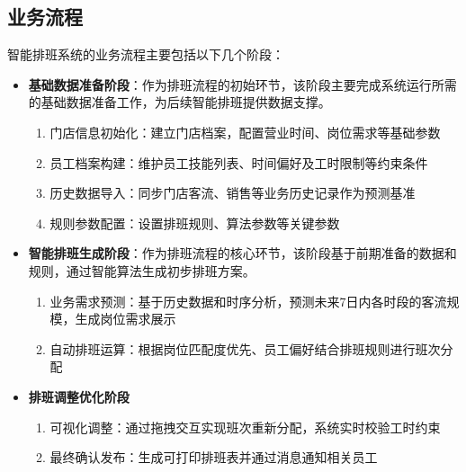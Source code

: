 \documentclass{ctexart}
\begin{document}
\begin{itemize}
    
\end{itemize}

\subsection{业务流程}
智能排班系统的业务流程主要包括以下几个阶段：

\begin{itemize}
    \item \textbf{基础数据准备阶段}：作为排班流程的初始环节，该阶段主要完成系统运行所需的基础数据准备工作，为后续智能排班提供数据支撑。
    \begin{enumerate}
        \item 门店信息初始化：建立门店档案，配置营业时间、岗位需求等基础参数
        \item 员工档案构建：维护员工技能列表、时间偏好及工时限制等约束条件
        \item 历史数据导入：同步门店客流、销售等业务历史记录作为预测基准
        \item 规则参数配置：设置排班规则、算法参数等关键参数
    \end{enumerate}

    \item \textbf{智能排班生成阶段}：作为排班流程的核心环节，该阶段基于前期准备的数据和规则，通过智能算法生成初步排班方案。
        \begin{enumerate}
            \item 业务需求预测：基于历史数据和时序分析，预测未来7日内各时段的客流规模，生成岗位需求展示
            \item 自动排班运算：根据岗位匹配度优先、员工偏好结合排班规则进行班次分配
        \end{enumerate}

    \item \textbf{排班调整优化阶段}
    \begin{enumerate}
        \item 可视化调整：通过拖拽交互实现班次重新分配，系统实时校验工时约束
        \item 最终确认发布：生成可打印排班表并通过消息通知相关员工
    \end{enumerate}
\end{itemize}
\end{document}
